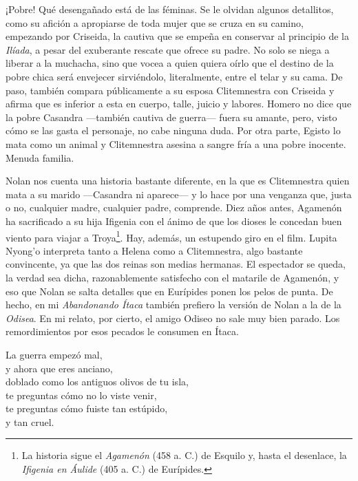 ¡Pobre! Qué desengañado está de las féminas. Se le olvidan algunos detallitos, como su afición a apropiarse de toda mujer que se cruza en su camino, empezando por Criseida, la cautiva que se empeña en conservar al principio de la \emph{Ilíada}, a pesar del exuberante rescate que ofrece su padre. No solo se niega a liberar a la muchacha, sino que vocea a quien quiera oírlo que el destino de la pobre chica será envejecer sirviéndolo, literalmente, entre el telar y su cama. De paso, también compara públicamente a su esposa Clitemnestra con Criseida y afirma que es inferior a esta en cuerpo, talle, juicio y labores. Homero no dice que la pobre Casandra ---también cautiva de guerra--- fuera su amante, pero, visto cómo se las gasta el personaje, no cabe ninguna duda. Por otra parte, Egisto lo mata como un animal y Clitemnestra asesina a sangre fría a una pobre inocente. Menuda familia.

Nolan nos cuenta una historia bastante diferente, en la que es Clitemnestra quien mata a su marido ---Casandra ni aparece--- y lo hace por una venganza que, justa o no, cualquier madre, cualquier padre, comprende. Diez años antes, Agamenón ha sacrificado a su hija Ifigenia con el ánimo de que los dioses le concedan buen viento para viajar a Troya\footnote{La historia sigue el \emph{Agamenón} (458 a. C.) de Esquilo y, hasta el desenlace, la \emph{Ifigenia en Áulide} (405 a. C.) de Eurípides.}. Hay, además, un estupendo giro en el film. Lupita Nyong'o interpreta tanto a Helena como a Clitemnestra, algo bastante convincente, ya que las dos reinas son medias hermanas. El espectador se queda, la verdad sea dicha, razonablemente satisfecho con el matarile de Agamenón, y eso que Nolan se salta detalles que en Eurípides ponen los pelos de punta. De hecho, en mi \emph{Abandonando Ítaca} también prefiero la versión de Nolan a la de la \emph{Odisea}. En mi relato, por cierto, el amigo Odiseo no sale muy bien parado. Los remordimientos por esos pecados le consumen en Ítaca.

\begin{versopropio}
La guerra empezó mal,\\
y ahora que eres anciano,\\
doblado como los antiguos olivos de tu isla,\\
te preguntas cómo no lo viste venir,\\
te preguntas cómo fuiste tan estúpido,\\
y tan cruel.
\end{versopropio}

